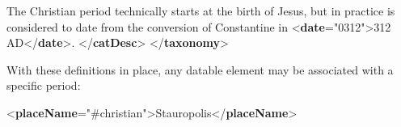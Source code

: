\begin{shaded}
\mbox{}\newline 
{}\mbox{}\newline 
\hspace*{1em} The Christian period technically starts at the birth of Jesus, but in practice is considered to date from\mbox{}\newline 
\hspace*{1em}\hspace*{1em}\hspace*{1em}\hspace*{1em} the conversion of Constantine in {<\textbf{date}\hspace*{1em}{when}="{0312}">}312 AD{</\textbf{date}>}. {</\textbf{catDesc}>}\mbox{}\newline 
{}\mbox{}\newline 
{</\textbf{taxonomy}>}\end{shaded}\egroup\par \par
With these definitions in place, any datable element may be associated with a specific period: \par\bgroup{}\exampleFont \begin{shaded}\noindent\mbox{}{<\textbf{placeName}\hspace*{1em}{period}="{\#christian}">}Stauropolis{</\textbf{placeName}>}\end{shaded}\egroup\par \par
